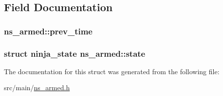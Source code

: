 \subsection{Field Documentation}
\hypertarget{structns__armed_a39c662c8477d026a17a6b8b1f76b8754}{
\subsubsection[{prev\+\_\+time}]{ ns\+\_\+armed\+::prev\+\_\+time}}\label{structns__armed_a39c662c8477d026a17a6b8b1f76b8754}
\hypertarget{structns__armed_a916e16ef9375df6aff9e85431c8d27e0}{
\subsubsection[{state}]{\setlength{\rightskip}{0pt plus 5cm}struct {\bf ninja\+\_\+state} ns\+\_\+armed\+::state}}\label{structns__armed_a916e16ef9375df6aff9e85431c8d27e0}


The documentation for this struct was generated from the following file\+:\begin{DoxyCompactItemize}
\item 
src/main/\hyperlink{ns__armed_8h}{ns\+\_\+armed.\+h}\end{DoxyCompactItemize}
